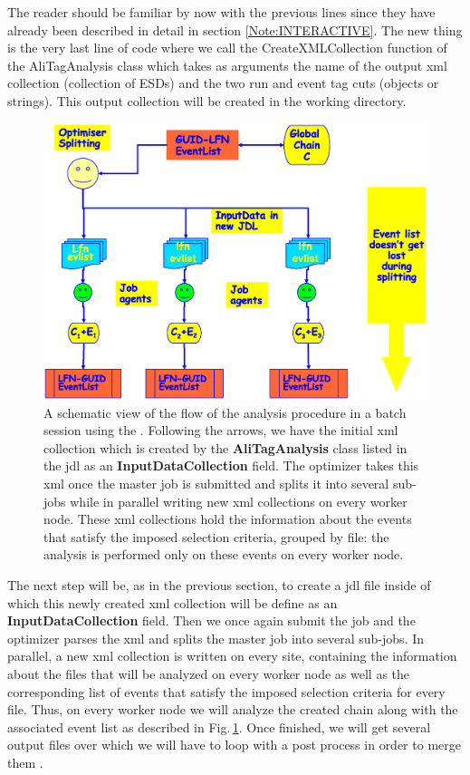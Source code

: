 \noindent The reader should be familiar by now with the previous lines since they have already been described in detail in section \ref{Note:INTERACTIVE}. The new thing is the very last line of code where we call the {\ttfamily CreateXMLCollection} function of the {\ttfamily AliTagAnalysis} class which takes as arguments the name of the output xml collection (collection of ESDs) and the two run and event tag cuts (objects or strings). This output collection will be created in the working directory.

\begin{figure}[ht!]
\begin{center}
\includegraphics[width=0.7\textheight]{figures/Batch2.eps}
\end{center}
\caption{A schematic view of the flow of the analysis procedure in a batch session using the \tag. Following the arrows, we have the initial xml collection which is created by the {\ttfamily \textbf{AliTagAnalysis}} class listed in the jdl as an {\ttfamily \textbf{InputDataCollection}} field. The optimizer takes this xml once the master job is submitted and splits it into several sub-jobs while in parallel writing new xml collections on every worker node. These xml collections hold the information about the events that satisfy the imposed selection criteria, grouped by file: the analysis is performed only on these events on every worker node.}
\label{Note:FigAnalsysisFlowBatchTag}
\end{figure}

The next step will be, as in the previous section, to create a jdl file inside of which this newly created xml collection will be define as an {\ttfamily \textbf{InputDataCollection}} field. Then we once again submit the job and the optimizer parses the xml and splits the master job into several sub-jobs. In parallel, a new xml collection is written on every site, containing the information about the files that will be analyzed on every worker node as well as the corresponding list of events that satisfy the imposed selection criteria for every file. Thus, on every worker node we will analyze the created chain along with the associated event list as described in Fig.\,\ref{Note:FigAnalsysisFlowBatchTag}. Once finished, we will get several output files over which we will have to loop with a post process in order to merge them \cite{Note:RefAlienTutorial,Note:RefEventTagWeb}.

